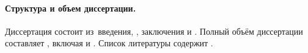 \paragraph*{Структура и объем диссертации. }
Диссертация состоит из~введения,
,
заключения и
.
%
Полный объём диссертации составляет
, включая
 и
.
Список литературы содержит
.